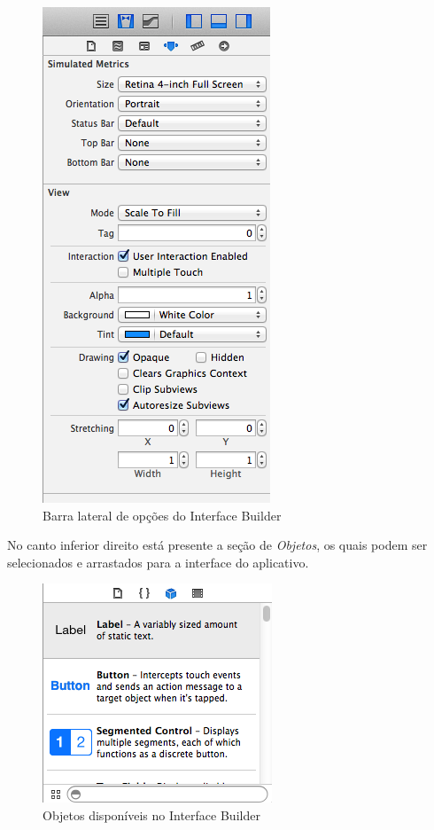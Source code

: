 \documentclass[a4paper,12pt,brazil,oneside]{book}
\begin{document}
\begin{figure}[H]
  \centering
  \includegraphics[scale=0.5]{figuras/3/tela_novo_projeto_11.png}
  \caption{Barra lateral de opções do Interface Builder}
  \label{fig:a}
\end{figure}


No canto inferior direito está presente a seção de \emph{Objetos}, os quais podem ser selecionados e arrastados para a interface do aplicativo.

\begin{figure}[H]
  \centering
  \includegraphics[scale=0.5]{figuras/3/tela_novo_projeto_12.png}
  \caption{Objetos disponíveis no Interface Builder}
  \label{fig:a}
\end{figure}
\end{document}
